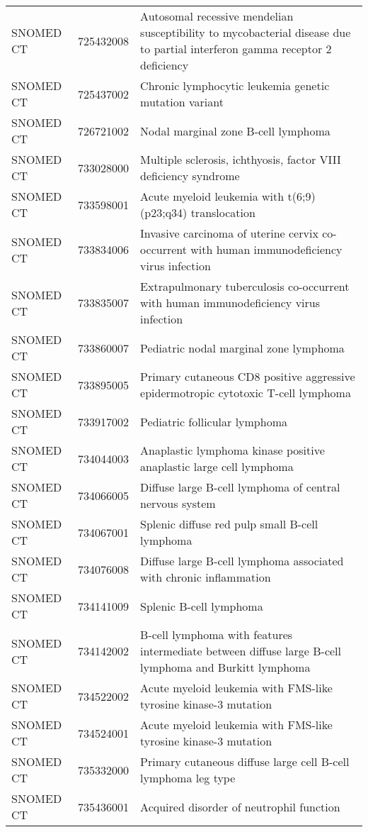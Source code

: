 \begin{longtable}{p{}p{}p{}}
  SNOMED CT & 725432008 & Autosomal recessive mendelian susceptibility to mycobacterial disease due to partial interferon gamma receptor 2 deficiency \\ 
  SNOMED CT & 725437002 & Chronic lymphocytic leukemia genetic mutation variant \\ 
  SNOMED CT & 726721002 & Nodal marginal zone B-cell lymphoma \\ 
  SNOMED CT & 733028000 & Multiple sclerosis, ichthyosis, factor VIII deficiency syndrome \\ 
  SNOMED CT & 733598001 & Acute myeloid leukemia with t(6;9)(p23;q34) translocation \\ 
  SNOMED CT & 733834006 & Invasive carcinoma of uterine cervix co-occurrent with human immunodeficiency virus infection \\ 
  SNOMED CT & 733835007 & Extrapulmonary tuberculosis co-occurrent with human immunodeficiency virus infection \\ 
  SNOMED CT & 733860007 & Pediatric nodal marginal zone lymphoma \\ 
  SNOMED CT & 733895005 & Primary cutaneous CD8 positive aggressive epidermotropic cytotoxic T-cell lymphoma \\ 
  SNOMED CT & 733917002 & Pediatric follicular lymphoma \\ 
  SNOMED CT & 734044003 & Anaplastic lymphoma kinase positive anaplastic large cell lymphoma \\ 
  SNOMED CT & 734066005 & Diffuse large B-cell lymphoma of central nervous system \\ 
  SNOMED CT & 734067001 & Splenic diffuse red pulp small B-cell lymphoma \\ 
  SNOMED CT & 734076008 & Diffuse large B-cell lymphoma associated with chronic inflammation \\ 
  SNOMED CT & 734141009 & Splenic B-cell lymphoma \\ 
  SNOMED CT & 734142002 & B-cell lymphoma with features intermediate between diffuse large B-cell lymphoma and Burkitt lymphoma \\ 
  SNOMED CT & 734522002 & Acute myeloid leukemia with FMS-like tyrosine kinase-3 mutation \\ 
  SNOMED CT & 734524001 & Acute myeloid leukemia with FMS-like tyrosine kinase-3 mutation \\ 
  SNOMED CT & 735332000 & Primary cutaneous diffuse large cell B-cell lymphoma leg type \\ 
  SNOMED CT & 735436001 & Acquired disorder of neutrophil function \\ 

\end{longtable}
